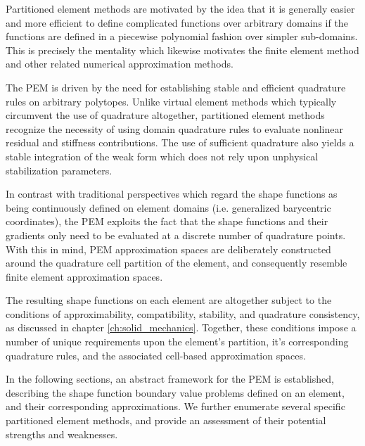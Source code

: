 Partitioned element methods are motivated by the idea that it is generally easier and more efficient to define complicated functions over arbitrary domains if the functions are defined in a piecewise polynomial fashion over simpler sub-domains. This is precisely the mentality which likewise motivates the finite element method and other related numerical approximation methods.

The PEM is driven by the need for establishing stable and efficient quadrature rules on arbitrary polytopes. Unlike virtual element methods which typically circumvent the use of quadrature altogether, partitioned element methods recognize the necessity of using domain quadrature rules to evaluate nonlinear residual and stiffness contributions. The use of sufficient quadrature also yields a stable integration of the weak form which does not rely upon unphysical stabilization parameters.

In contrast with traditional perspectives which regard the shape functions as being continuously defined on element domains (i.e. generalized barycentric coordinates), the PEM exploits the fact that the shape functions and their gradients only need to be evaluated at a discrete number of quadrature points. With this in mind, PEM approximation spaces are deliberately constructed around the quadrature cell partition of the element, and consequently resemble finite element approximation spaces.

The resulting shape functions on each element are altogether subject to the conditions of approximability, compatibility, stability, and quadrature consistency, as discussed in chapter \ref{ch:solid_mechanics}. Together, these conditions impose a number of unique requirements upon the element's partition, it's corresponding quadrature rules, and the associated cell-based approximation spaces.

In the following sections, an abstract framework for the PEM is established, describing the shape function boundary value problems defined on an element, and their corresponding approximations. We further enumerate several specific partitioned element methods, and provide an assessment of their potential strengths and weaknesses.


